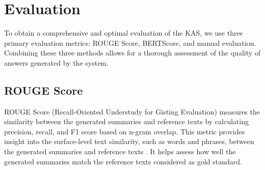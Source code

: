 \documentclass[runningheads]{llncs}
\begin{document}
\section{Evaluation}
To obtain a comprehensive and optimal evaluation of the KAS, we use three primary evaluation metrics: ROUGE Score, BERTScore, and manual evaluation. Combining these three methods allows for a thorough assessment of the quality of answers generated by the system.

\subsection{ROUGE Score}
ROUGE Score (Recall-Oriented Understudy for Gisting Evaluation) measures the similarity between the generated summaries and reference texts by calculating precision, recall, and F1 score based on n-gram overlap. This metric provides insight into the surface-level text similarity, such as words and phrases, between the generated summaries and reference texts \cite{Lin2004}. It helps assess how well the generated summaries match the reference texts considered as gold standard.
\end{document}
